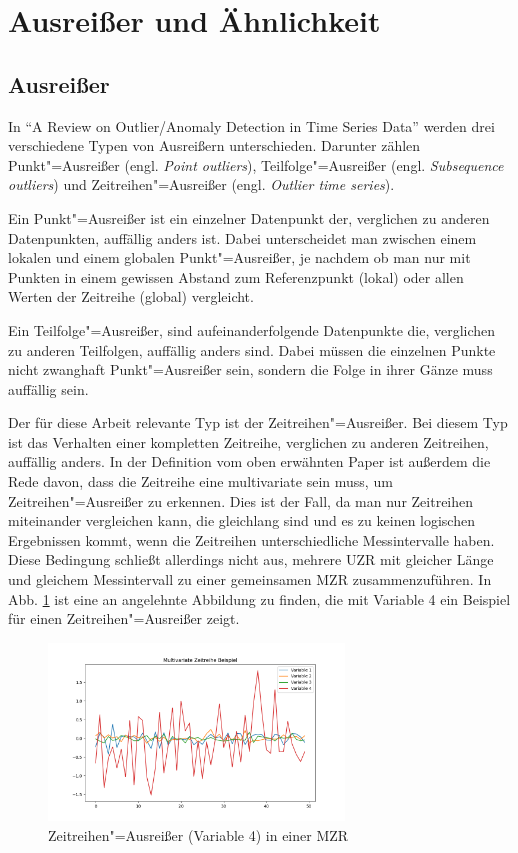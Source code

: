 \section{Ausreißer und Ähnlichkeit}
\subsection{Ausreißer}
In "`A Review on Outlier/Anomaly Detection in Time Series Data"' \cite[Ch. 2.2]{aauj2021} werden drei verschiedene Typen von Ausreißern unterschieden. Darunter zählen Punkt"=Ausreißer (engl. \textit{Point outliers}), Teilfolge"=Ausreißer (engl. \textit{Subsequence outliers}) und Zeitreihen"=Ausreißer (engl. \textit{Outlier time series}).

Ein Punkt"=Ausreißer ist ein einzelner Datenpunkt der, verglichen zu anderen Datenpunkten, auffällig anders ist. Dabei unterscheidet man zwischen einem lokalen und einem globalen Punkt"=Ausreißer, je nachdem ob man nur mit Punkten in einem gewissen Abstand zum Referenzpunkt (lokal) oder allen Werten der Zeitreihe (global) vergleicht.

Ein Teilfolge"=Ausreißer, sind aufeinanderfolgende Datenpunkte die, verglichen zu anderen Teilfolgen, auffällig anders sind. Dabei müssen die einzelnen Punkte nicht zwanghaft Punkt"=Ausreißer sein, sondern die Folge in ihrer Gänze muss auffällig sein. 

Der für diese Arbeit relevante Typ ist der Zeitreihen"=Ausreißer. Bei diesem Typ ist das Verhalten einer kompletten Zeitreihe, verglichen zu anderen Zeitreihen, auffällig anders. In der Definition vom oben erwähnten Paper \cite{aauj2021} ist außerdem die Rede davon, dass die Zeitreihe eine multivariate sein muss, um Zeitreihen"=Ausreißer zu erkennen. Dies ist der Fall, da man nur Zeitreihen miteinander vergleichen kann, die gleichlang sind und es zu keinen logischen Ergebnissen kommt, wenn die Zeitreihen unterschiedliche Messintervalle haben. Diese Bedingung schließt allerdings nicht aus, mehrere \acs{UZR} mit gleicher Länge und gleichem Messintervall zu einer gemeinsamen \acs{MZR} zusammenzuführen. In Abb. \ref{fig:ZeitreihenAusreisserBeispiel} ist eine an \cite[Fig. 5]{aauj2021} angelehnte Abbildung zu finden, die mit Variable 4 ein Beispiel für einen Zeitreihen"=Ausreißer zeigt.
\begin{figure}[bth] 
  \centering
  \includegraphics[width=0.7\textwidth]{Graphics/TimeSeriesOutlierExample.png}
  \caption{Zeitreihen"=Ausreißer (Variable 4) in einer \acs{MZR}}
  \label{fig:ZeitreihenAusreisserBeispiel}
\end{figure}


